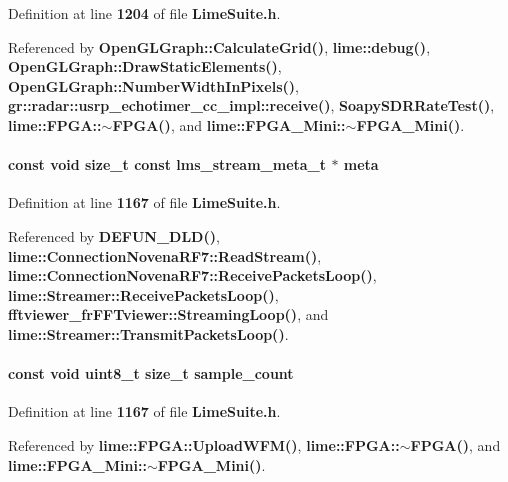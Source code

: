 Definition at line {\bf 1204} of file {\bf Lime\+Suite.\+h}.



Referenced by {\bf Open\+G\+L\+Graph\+::\+Calculate\+Grid()}, {\bf lime\+::debug()}, {\bf Open\+G\+L\+Graph\+::\+Draw\+Static\+Elements()}, {\bf Open\+G\+L\+Graph\+::\+Number\+Width\+In\+Pixels()}, {\bf gr\+::radar\+::usrp\+\_\+echotimer\+\_\+cc\+\_\+impl\+::receive()}, {\bf Soapy\+S\+D\+R\+Rate\+Test()}, {\bf lime\+::\+F\+P\+G\+A\+::$\sim$\+F\+P\+G\+A()}, and {\bf lime\+::\+F\+P\+G\+A\+\_\+\+Mini\+::$\sim$\+F\+P\+G\+A\+\_\+\+Mini()}.

\paragraph[{meta}]{\setlength{\rightskip}{0pt plus 5cm}const {\bf void} size\+\_\+t const {\bf lms\+\_\+stream\+\_\+meta\+\_\+t} $\ast$ meta}\label{group__FN__STREAM_ga98712045602c817c3807ce704b135f88}


Definition at line {\bf 1167} of file {\bf Lime\+Suite.\+h}.



Referenced by {\bf D\+E\+F\+U\+N\+\_\+\+D\+L\+D()}, {\bf lime\+::\+Connection\+Novena\+R\+F7\+::\+Read\+Stream()}, {\bf lime\+::\+Connection\+Novena\+R\+F7\+::\+Receive\+Packets\+Loop()}, {\bf lime\+::\+Streamer\+::\+Receive\+Packets\+Loop()}, {\bf fftviewer\+\_\+fr\+F\+F\+Tviewer\+::\+Streaming\+Loop()}, and {\bf lime\+::\+Streamer\+::\+Transmit\+Packets\+Loop()}.

\paragraph[{sample\+\_\+count}]{\setlength{\rightskip}{0pt plus 5cm}const {\bf void} uint8\+\_\+t size\+\_\+t sample\+\_\+count}\label{group__FN__STREAM_ga072869ef257c91ea95fe774cdbb4942e}


Definition at line {\bf 1167} of file {\bf Lime\+Suite.\+h}.



Referenced by {\bf lime\+::\+F\+P\+G\+A\+::\+Upload\+W\+F\+M()}, {\bf lime\+::\+F\+P\+G\+A\+::$\sim$\+F\+P\+G\+A()}, and {\bf lime\+::\+F\+P\+G\+A\+\_\+\+Mini\+::$\sim$\+F\+P\+G\+A\+\_\+\+Mini()}.

